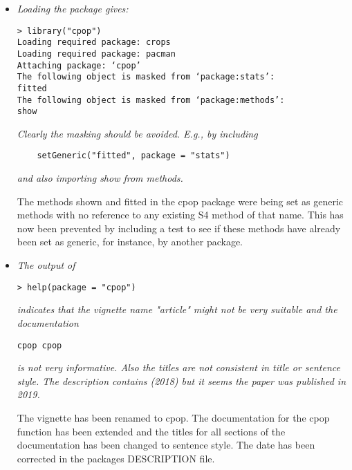 \documentclass[12pt]{article}
\begin{document}
\begin{itemize}
We have now implemented a default method for estimating the standard deviation of the noise -- based on the variance of the second differences of the data. We have also added a warning if the user does not specify the standard deviation (and thus this default is used). We have similarly added a warning if the user does not specify the penalty (beta) -- as errors in specifying sd or beta have the same affect of impacting the estimate of the number of changepoints.

How to estimate the noise standard deviation is covered in some of the examples int he paper, and in particular we suggest using the CROPS function to run CPOP with a range of beta values (which is equivalent to running it for a fixed beta value and a range of sd values).

\item {\em Loading the package gives:}
\begin{verbatim}
> library("cpop")
Loading required package: crops
Loading required package: pacman
Attaching package: ‘cpop’
The following object is masked from ‘package:stats’:
fitted
The following object is masked from ‘package:methods’:
show
\end{verbatim}
{\em Clearly the masking should be avoided. E.g., by including}
\begin{verbatim}
    setGeneric("fitted", package = "stats")
\end{verbatim}
{\em and also importing show from methods.}

The methods shown and fitted in the cpop package were being set as generic methods with no reference to any existing S4 method of that name. This has now been prevented by including a test to see if these methods have already been set as generic, for instance, by another package.


\item {\em The output of}
\begin{verbatim}
> help(package = "cpop")
\end{verbatim}
{\em indicates that the vignette name "article" might not be very suitable and the documentation}
\begin{verbatim}
cpop cpop
\end{verbatim}
{\em is not very informative. Also the titles are not consistent in title or sentence style.
The description contains (2018) but it seems the paper was published in 2019.}

The vignette has been renamed to cpop. The documentation for the cpop function has been extended and the titles
for all sections of the documentation has been changed to sentence style. The date has been corrected in the packages DESCRIPTION file.


\end{itemize}
\end{document}
